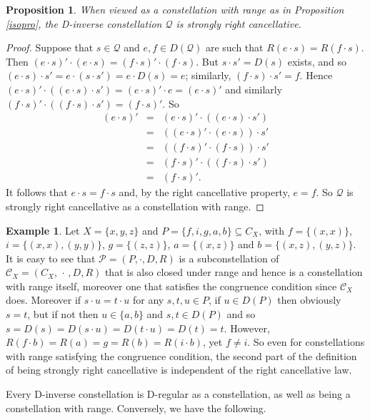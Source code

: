 \documentclass[12pt]{amsart}
\newtheorem{pro}[thm]{Proposition}
\theoremstyle{definition}
\newtheorem{eg}[thm]{Example}
\newcommand{\bea}{\begin{eqnarray*}}
\newcommand{\eea}{\end{eqnarray*}}
\newcommand{\Q}{\mathcal Q}
\newcommand{\C}{\mathcal C}
\begin{document}
\begin{pro}  \label{isopro2}
When viewed as a constellation with range as in Proposition \ref{isopro}, the D-inverse constellation $\Q$ is strongly right cancellative.
\end{pro}
\begin{proof}
Suppose that $s\in \Q$ and $e,f\in D(\Q)$ are such that $R(e\cdot s)=R(f\cdot s)$. Then  $(e\cdot s)'\cdot (e\cdot s)=(f\cdot s)'\cdot (f\cdot s)$.  But $s\cdot s'=D(s)$ exists, and so $(e\cdot s)\cdot s'=e\cdot (s \cdot s')=e\cdot D(s)=e$;  similarly, $(f\cdot s)\cdot s'=f$.  Hence 
$(e\cdot s)'\cdot ((e\cdot s)\cdot s')=(e\cdot s)'\cdot e=(e\cdot s)'$ and similarly $(f\cdot s)'\cdot ((f\cdot s)\cdot s')=(f\cdot s)'$.  So 
\bea
(e\cdot s)'&=&(e\cdot s)'\cdot ((e\cdot s)\cdot s')\\
&=&((e\cdot s)'\cdot (e\cdot s))\cdot s'\\
&=&((f\cdot s)'\cdot (f\cdot s))\cdot s'\\
&=&(f\cdot s)'\cdot ((f\cdot s)\cdot s')\\
&=&(f\cdot s)'. 
\eea 
It follows that $e\cdot s=f\cdot s$ and, by the right cancellative property, $e=f$.  So  $\Q$ is strongly right cancellative as a constellation with range.
\end{proof}

\begin{eg}  \label{counter2}
Let $X=\{x,y,z\}$ and $P=\{f,i,g,a,b\}\subseteq C_X$, with $f=\{(x,x)\}$, $i=\{(x,x),(y,y)\}$, $g=\{(z,z)\}$, $a=\{(x,z)\}$ and $b=\{(x,z),(y,z)\}$.  It is easy to see that $\mathcal{P}=(P,\cdot,D,R)$ is a subconstellation of  $\C_X=(C_X,\, \cdot\, ,D,R)$ that is also closed under range and hence is a constellation with range itself, moreover one that satisfies the congruence condition since $\C_X$ does.  
Moreover if $s\cdot u=t\cdot u$ for any $s,t,u\in P$, if $u\in D(P)$ then obviously $s=t$, but if not then $u\in \{a,b\}$ and $s,t\in D(P)$ and so $s=D(s)=D(s\cdot u)=D(t\cdot u)=D(t)=t$.  
However, $R(f\cdot b)=R(a)=g=R(b)=R(i\cdot b)$, yet $f\neq i$.  So even for constellations with range satisfying the congruence condition, the second part of the definition of being strongly right cancellative is independent of the right cancellative law.\end{eg}

Every D-inverse constellation is D-regular as a constellation, as well as being a constellation with range.  Conversely, we have the following.  
\end{document}
